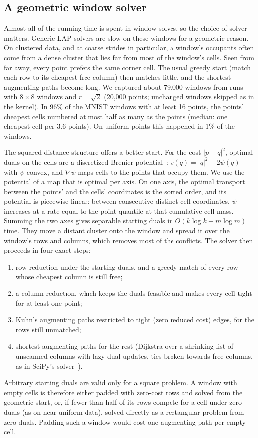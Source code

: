 \subsection{A geometric window solver}
\label{sec:geosolver}

Almost all of the running time is spent in window solves, so the choice of solver matters. Generic
LAP solvers are slow on these windows for a geometric reason. On clustered data, and at
coarse strides in particular, a window's occupants often come from a dense cluster that
lies far from most of the window's cells. Seen from far away, every point prefers the same
corner cell. The usual greedy start (match each row to its cheapest free column) then
matches little, and the shortest augmenting paths become long. We captured about
79{,}000 windows from runs with $8\times8$ windows and $r=\sqrt2$ (20{,}000 points; unchanged
windows skipped as in the kernel). In 96\% of the MNIST windows with at least 16 points, the
points' cheapest cells numbered at most half as many as the points (median: one cheapest
cell per 3.6 points). On uniform points this happened in 1\% of the windows.

The squared-distance structure offers a better start. For the cost $|p-q|^2$, optimal
duals on the cells are a discretized Brenier potential~\citep{brenier1991polar}: $v(q)=|q|^2-2\psi(q)$ with $\psi$
convex, and $\nabla\psi$ maps cells to the points that occupy them. We use the potential
of a map that is optimal per axis. On one axis, the optimal transport between the points'
and the cells' coordinates is the sorted order, and its potential is piecewise linear:
between consecutive distinct cell coordinates, $\psi$ increases at a rate equal to the
point quantile at that cumulative cell mass. Summing the two axes gives separable starting
duals in $O(k\log k+m\log m)$ time. They move a distant cluster onto the window and
spread it over the window's rows and columns, which removes most of the conflicts. The
solver then proceeds in four exact steps:
\begin{enumerate}
\item row reduction under the starting duals, and a greedy match of every row whose
  cheapest column is still free;
\item a column reduction, which keeps the duals feasible and makes every cell tight for at
  least one point;
\item Kuhn's augmenting paths restricted to tight (zero reduced cost) edges, for the rows
  still unmatched;
\item shortest augmenting paths for the rest (Dijkstra over a shrinking list of unscanned
  columns with lazy dual updates, ties broken towards free columns, as in
  SciPy's solver~\citep{crouse2016implementing}).
\end{enumerate}
Arbitrary starting duals are valid only for a square problem. A window with empty cells is
therefore either padded with zero-cost rows and solved from the geometric start, or, if
fewer than half of its rows compete for a cell under zero duals (as on near-uniform data),
solved directly as a rectangular problem from zero duals. Padding such a window would cost
one augmenting path per empty cell.


